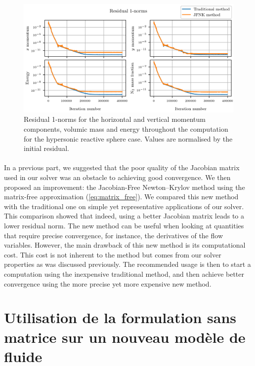         \begin{figure}
          \centering
          \includegraphics{figures/sphere_reac_residuals.png}
          \caption{Residual 1-norms for the horizontal and vertical momentum components,  volumic mass and energy throughout the computation for the hypersonic reactive sphere case.
          Values are normalised by the initial residual.}
          \label{fig:sphere_reac_residuals}
        \end{figure}

    \paragraph{}
    In a previous part, we suggested that the poor quality of the Jacobian matrix used in our solver was an obstacle to achieving good convergence.
    We then proposed an improvement: the Jacobian-Free Newton--Krylov method using the matrix-free approximation (\ref{eq:matrix_free}).
    We compared this new method with the traditional one on simple yet representative applications of our solver.
    This comparison showed that indeed, using a better Jacobian matrix leads to a lower residual norm.
    The new method can be useful when looking at quantities that require precise convergence, for instance, the derivatives of the flow variables.
    However, the main drawback of this new method is its computational cost.
    This cost is not inherent to the method but comes from our solver properties as was discussed previously.
    The recommended usage is then to start a computation using the inexpensive traditional method, and then achieve better convergence using the more precise yet more expensive new method.


  \section{Utilisation de la formulation sans matrice sur un nouveau modèle de fluide}

